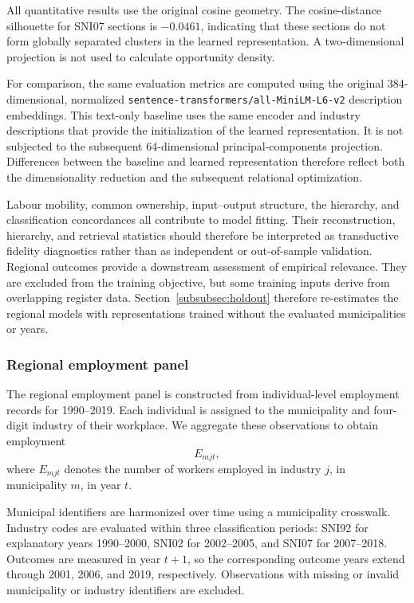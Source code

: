 \documentclass[9pt,twoside]{pnas-new}
\begin{document}
All quantitative results use the original cosine geometry. The cosine-distance silhouette for SNI07 sections is $-0.0461$, indicating that these sections do not form globally separated clusters in the learned representation. A two-dimensional projection is not used to calculate opportunity density.

For comparison, the same evaluation metrics are computed using the original
384-dimensional, normalized
\texttt{sentence-transformers/all-MiniLM-L6-v2} description embeddings. This
text-only baseline uses the same encoder and industry descriptions that
provide the initialization of the learned representation. It is not subjected
to the subsequent 64-dimensional principal-components projection. Differences
between the baseline and learned representation therefore reflect both the
dimensionality reduction and the subsequent relational optimization.

Labour mobility, common ownership, input--output structure, the hierarchy,
and classification concordances all contribute to model fitting. Their
reconstruction, hierarchy, and retrieval statistics should therefore be
interpreted as transductive fidelity diagnostics rather than as independent
or out-of-sample validation. Regional outcomes provide a downstream assessment of empirical relevance. They are excluded from the training objective, but some training inputs derive from overlapping register data. Section~\ref{subsubsec:holdout} therefore re-estimates the regional models with representations trained without the evaluated municipalities or years.

\subsubsection{Regional employment panel}
\label{subsubsec:regional_employment_panel}

The regional employment panel is constructed from individual-level employment
records for 1990--2019. Each individual is assigned to the municipality and
four-digit industry of their workplace. We aggregate these observations to
obtain employment
\[
E_{mjt},
\]
where \(E_{mjt}\) denotes the number of workers employed in industry \(j\), in
municipality \(m\), in year \(t\).

Municipal identifiers are harmonized over time using a municipality
crosswalk. Industry codes are evaluated within three classification periods:
SNI92 for explanatory years 1990--2000, SNI02 for 2002--2005, and SNI07 for
2007--2018. Outcomes are measured in year \(t+1\), so the corresponding outcome
years extend through 2001, 2006, and 2019, respectively. Observations with
missing or invalid municipality or industry identifiers are excluded.
\end{document}

